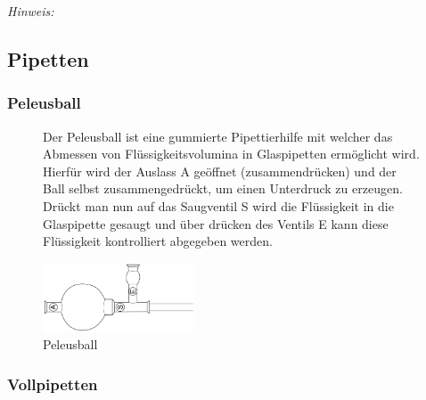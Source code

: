 	
	\vspace*{5mm}
	
	\textit{Hinweis:}\\
	\vspace*{-5mm}
	
	
	\newpage

\subsection{Pipetten}
\subsubsection*{Peleusball}
\begin{figure}[h!]
	\begin{minipage}[t]{0.73\textwidth}
		\vspace{0pt}
		Der Peleusball ist eine gummierte Pipettierhilfe mit welcher das Abmessen von Flüssigkeitsvolumina in Glaspipetten ermöglicht wird. Hierfür wird der Auslass A geöffnet (zusammendrücken) und der Ball selbst zusammengedrückt, um einen Unterdruck zu erzeugen. Drückt man nun auf das Saugventil S wird die Flüssigkeit in die Glaspipette gesaugt und über drücken des Ventils E kann diese Flüssigkeit kontrolliert abgegeben werden.
	\end{minipage}
	\hfill
	\begin{minipage}[t]{0.25\textwidth}
		\vspace{0pt}
		\centering
		\includegraphics[angle=-90,width=0.4\textwidth]{img/peleusball}
		\caption{Peleusball}
		\label{fig:peleus}
	\end{minipage}
\end{figure}
\FloatBarrier

\subsubsection*{Vollpipetten}

